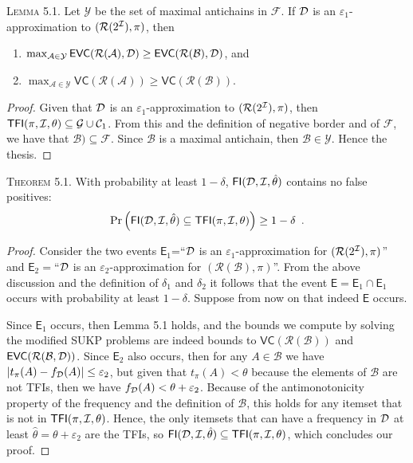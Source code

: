 \documentclass[twoside,leqno,twocolumn]{article}
\def\Ds{{\cal D}}
\def\Itm{{\cal I}}
\def\FI{\mathsf{FI}}
\def\TFI{\mathsf{TFI}}
\def\VC{\mathsf{VC}}
\def\EVC{\mathsf{EVC}}
\def\prob{\pi}
\def\tfreq{t_\prob}
\def\range{\mathcal{R}}
\begin{document}
\textsc{Lemma 5.1.} Let $\mathcal{Y}$ be the set of maximal antichains in $\mathcal{F}$. If
  $\Ds$ is an $\varepsilon_1$-approximation to $(\range(2^\Itm),\prob)$, then
  \begin{enumerate}
    \item
      $\max_{\mathcal{A}\in\mathcal{Y}}\EVC(\range(\mathcal{A}),\Ds)\ge\EVC(\range(\mathcal{B}),\Ds)$,
      and
    \item
      $\max_{\mathcal{A}\in\mathcal{Y}}\VC(\range(\mathcal{A}))\ge\VC(\range(\mathcal{B}))$.
  \end{enumerate}
\begin{proof}
  Given %
  that $\Ds$ is an $\varepsilon_1$-approximation to $(\range(2^\Itm),\prob)$, %
  then %
  $\TFI(\prob,\Itm,\theta)\subseteq\mathcal{G}\cup\mathcal{C}_1$. From this and
  the definition of negative border and of $\mathcal{F}$, we have that
  $\mathcal{B})\subseteq\mathcal{F}$. Since $\mathcal{B}$ is a maximal
  antichain, then $\mathcal{B}\in\mathcal{Y}$. Hence the thesis.
\end{proof}

\textsc{Theorem 5.1.}
With probability at least $1-\delta$, %
$\FI(\Ds,\Itm,\hat\theta)$ contains no false positives:
\[
\Pr\left(\FI(\Ds,\Itm,\hat\theta)\subseteq\TFI(\prob,\Itm,\theta)\right)\ge 1-\delta\enspace.\]
\begin{proof}
  Consider the two events $\mathsf{E}_1$=``$\Ds$ is an
  $\varepsilon_1$-approximation for $(\range(2^\Itm),\prob)$'' and
  $\mathsf{E}_2=$``$\Ds$ is an
  $\varepsilon_2$-approximation for $(\range(\mathcal{B}),\prob)$''. From
  the above discussion and the definition of $\delta_1$ and $\delta_2$ it
  follows that the event $\mathsf{E}=\mathsf{E}_1\cap\mathsf{E}_1$ occurs with
  probability at least $1-\delta$. Suppose from now on that indeed $\mathsf{E}$
  occurs.

  Since $\mathsf{E}_1$ occurs, then Lemma 5.1
  holds, and the bounds we compute by solving the modified SUKP problems are
  indeed bounds to $\VC(\range(\mathcal{B}))$ and
  $\EVC(\range(\mathcal{B},\Ds))$. %
  Since $\mathsf{E}_2$ also occurs, then for any $A\in\mathcal{B}$ we
  have $|\tfreq(A)-f_\Ds(A)|\le\varepsilon_2$, but given that $\tfreq(A)<\theta$
  because the elements of $\mathcal{B}$ are not TFIs, then we have
  $f_\Ds(A)<\theta+\varepsilon_2$. Because of the antimonotonicity property
  of the frequency and the definition of $\mathcal{B}$, this holds for any
  itemset that is not in $\TFI(\prob,\Itm,\theta)$. Hence, the only itemsets that can have a
  frequency in $\Ds$ at least $\hat{\theta}=\theta+\varepsilon_2$ are the TFIs, so
  $\FI(\Ds,\Itm,\hat{\theta})\subseteq\TFI(\prob,\Itm,\theta)$, which concludes
  our proof.
\end{proof}
\end{document}
